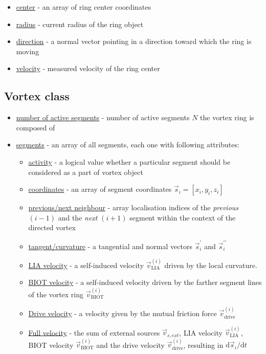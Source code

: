 \begin{itemize}
	\item \underline{center} - an array of ring center coordinates
	\item \underline{radius} - current radius of the ring object
	\item \underline{direction} - a normal vector pointing in a direction toward which the ring is moving
	\item \underline{velocity} - measured velocity of the ring center
\end{itemize}


\subsection*{Vortex class}

\begin{itemize}
	\item \underline{number of active segments} - number of active segments $N$ the vortex ring is composed of
	\item \underline{segments} - an array of all segments, each one with following attributes:
	\begin{itemize}
		\item \underline{activity} - a logical value whether a particular segment should be considered as a part of vortex object
		\item \underline{coordinates} - an array of segment coordinates $\vec{s}_i = [x_i,y_i,z_i]$
		\item \underline{previous/next neighbour} - array localisation indices of the \textit{previous} $(i-1)$ and the \textit{next} $(i+1)$ segment within the context of the directed vortex
		\item \underline{tangent/curvature} - a tangential and normal vectors $\vec{s}^{\prime}_i$ and $\vec{s}^{\prime\prime}_i$

		\item \underline{LIA velocity} - a self-induced velocity $\vec{v}_{\text{LIA}}^{(i)}$ driven by the local curvature.
		\item \underline{BIOT velocity} - a self-induced velocity driven by the farther segment lines of the vortex ring $\vec{v}_{\text{BIOT}}^{(i)}$

		\item \underline{Drive velocity} - a velocity given by the mutual friction force $\vec{v}_{\text{drive}}^{(i)}$
		\item \underline{Full velocity} - the sum of external sources $\vec{v}_{s,ext}$, LIA velocity $\vec{v}_{\text{LIA}}^{(i)}$, BIOT velocity $\vec{v}_{\text{BIOT}}^{(i)}$ and the drive velocity $\vec{v}_{\text{drive}}^{(i)}$, resulting in $\text{d}\vec{s}_i / \text{d}t$
	\end{itemize}
\end{itemize}

